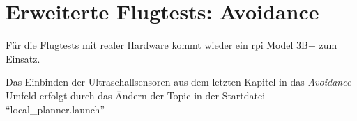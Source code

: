 \chapter{Erweiterte Flugtests: Avoidance}
Für die Flugtests mit realer Hardware kommt wieder ein \gls{rpi} Model 3B+ zum Einsatz. 

Das Einbinden der Ultraschallsensoren aus dem letzten Kapitel in das \textit{Avoidance} Umfeld erfolgt durch das Ändern der Topic in der Startdatei \enquote{local\_planner.launch}

